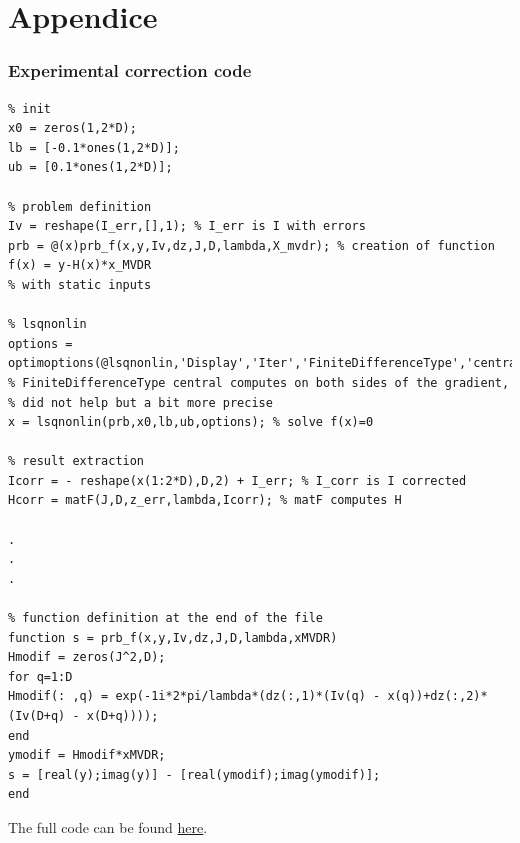 \documentclass[titlepage,11pt]{article}
\begin{document}
	\newpage
	\part{Appendice}
	\section*{Experimental correction code}
	
\begin{verbatim}
% init
x0 = zeros(1,2*D);
lb = [-0.1*ones(1,2*D)];
ub = [0.1*ones(1,2*D)];

% problem definition
Iv = reshape(I_err,[],1); % I_err is I with errors
prb = @(x)prb_f(x,y,Iv,dz,J,D,lambda,X_mvdr); % creation of function f(x) = y-H(x)*x_MVDR 
% with static inputs

% lsqnonlin
options = optimoptions(@lsqnonlin,'Display','Iter','FiniteDifferenceType','central'); 
% FiniteDifferenceType central computes on both sides of the gradient,
% did not help but a bit more precise
x = lsqnonlin(prb,x0,lb,ub,options); % solve f(x)=0

% result extraction
Icorr = - reshape(x(1:2*D),D,2) + I_err; % I_corr is I corrected
Hcorr = matF(J,D,z_err,lambda,Icorr); % matF computes H 

.
.
.

% function definition at the end of the file
function s = prb_f(x,y,Iv,dz,J,D,lambda,xMVDR)
Hmodif = zeros(J^2,D);
for q=1:D
Hmodif(: ,q) = exp(-1i*2*pi/lambda*(dz(:,1)*(Iv(q) - x(q))+dz(:,2)*(Iv(D+q) - x(D+q))));
end 
ymodif = Hmodif*xMVDR;
s = [real(y);imag(y)] - [real(ymodif);imag(ymodif)];
end

\end{verbatim}

	The full code can be found \href{https://github.com/RUValaS/RDR}{here}.
	
	\newpage
	\printbibliography
\end{document}
